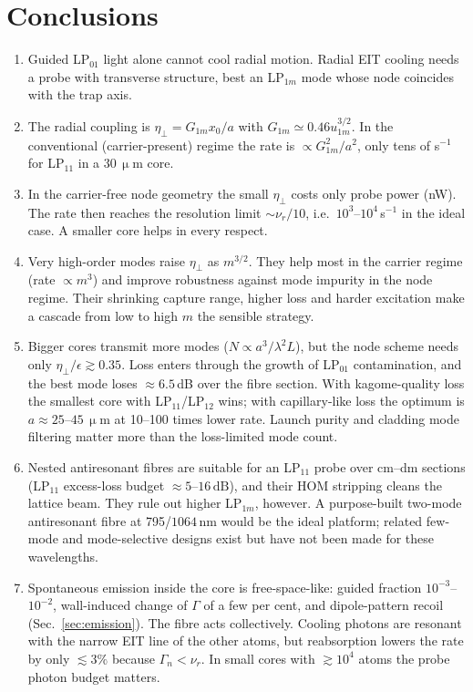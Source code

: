 \documentclass[11pt,a4paper]{article}
\newcommand{\micrometre}{\upmu m}\newcommand{\microkelvin}{\upmu K}
\newcommand{\SI}[2]{\ensuremath{#1\,\mathrm{#2}}}
\newcommand{\etaeff}{\eta_{\perp}}
\begin{document}
\section{Conclusions}
\begin{enumerate}
\item Guided LP$_{01}$ light alone cannot cool radial motion. Radial EIT cooling needs a probe with transverse structure, best an LP$_{1m}$ mode whose node coincides with the trap axis.
\item The radial coupling is $\etaeff=G_{1m}x_0/a$ with $G_{1m}\simeq0.46u_{1m}^{3/2}$. In the conventional (carrier-present) regime the rate is $\propto G_{1m}^2/a^2$, only tens of s$^{-1}$ for LP$_{11}$ in a \SI{30}{\micrometre} core.
\item In the carrier-free node geometry the small $\etaeff$ costs only probe power (nW). The rate then reaches the resolution limit $\sim\nu_r/10$, i.e.\ $10^3$--$10^4\,$s$^{-1}$ in the ideal case. A smaller core helps in every respect.
\item Very high-order modes raise $\etaeff$ as $m^{3/2}$. They help most in the carrier regime (rate $\propto m^3$) and improve robustness against mode impurity in the node regime. Their shrinking capture range, higher loss and harder excitation make a cascade from low to high $m$ the sensible strategy.
\item Bigger cores transmit more modes ($N\propto a^3/\lambda^2L$), but the node scheme needs only $\etaeff/\epsilon\gtrsim0.35$. Loss enters through the growth of LP$_{01}$ contamination, and the best mode loses $\approx6.5$\,dB over the fibre section. With kagome-quality loss the smallest core with LP$_{11}$/LP$_{12}$ wins; with capillary-like loss the optimum is $a\approx25$--\SI{45}{\micrometre} at 10--100 times lower rate. Launch purity and cladding mode filtering matter more than the loss-limited mode count.
\item Nested antiresonant fibres are suitable for an LP$_{11}$ probe over cm--dm sections (LP$_{11}$ excess-loss budget $\approx5$--\SI{16}{dB}), and their HOM stripping cleans the lattice beam. They rule out higher LP$_{1m}$, however. A purpose-built two-mode antiresonant fibre at 795/\SI{1064}{nm} would be the ideal platform; related few-mode and mode-selective designs exist but have not been made for these wavelengths.
\item Spontaneous emission inside the core is free-space-like: guided fraction $10^{-3}$--$10^{-2}$, wall-induced change of $\Gamma$ of a few per cent, and dipole-pattern recoil (Sec.~\ref{sec:emission}). The fibre acts collectively. Cooling photons are resonant with the narrow EIT line of the other atoms, but reabsorption lowers the rate by only $\lesssim3\%$ because $\Gamma_n<\nu_r$. In small cores with $\gtrsim10^4$ atoms the probe photon budget matters.

\end{enumerate}
\end{document}
